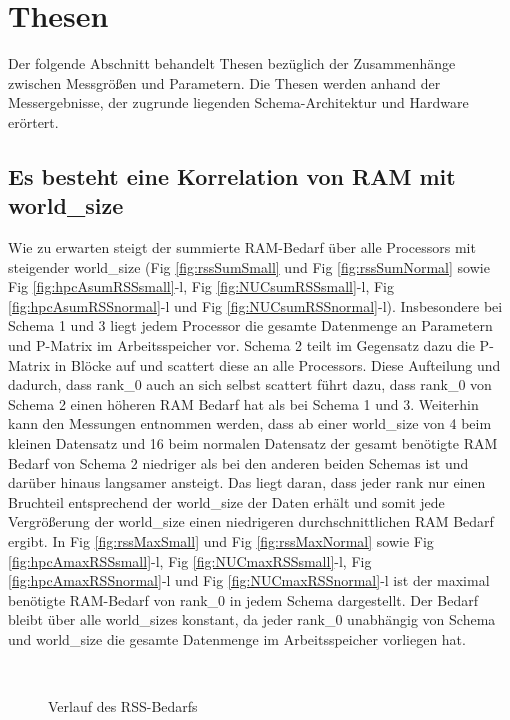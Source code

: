 \section{Thesen}
\label{sec:thesen}

Der folgende Abschnitt behandelt Thesen bezüglich der Zusammenhänge zwischen Messgrößen und Parametern.
Die Thesen werden anhand der Messergebnisse, der zugrunde liegenden Schema-Architektur und Hardware erörtert.

\subsection{Es besteht eine Korrelation von RAM mit world\_size}

Wie zu erwarten steigt der summierte RAM-Bedarf über alle Processors mit steigender world\_size
(Fig \ref{fig:rssSumSmall} und Fig \ref{fig:rssSumNormal} sowie Fig \ref{fig:hpcAsumRSSsmall}-l, Fig \ref{fig:NUCsumRSSsmall}-l, Fig \ref{fig:hpcAsumRSSnormal}-l und Fig \ref{fig:NUCsumRSSnormal}-l).
Insbesondere bei Schema 1 und 3 liegt jedem Processor
die gesamte Datenmenge an Parametern und P-Matrix im Arbeitsspeicher vor.
Schema 2 teilt im Gegensatz dazu die P-Matrix in Blöcke auf und scattert diese an alle Processors.
Diese Aufteilung und dadurch, dass rank\_0 auch an sich selbst
scattert führt dazu, dass rank\_0 von Schema 2 einen höheren RAM Bedarf hat als bei Schema 1 und 3.
Weiterhin kann den Messungen entnommen werden,
dass ab einer world\_size von 4 beim kleinen Datensatz und 16 beim normalen Datensatz
der gesamt benötigte RAM Bedarf von Schema 2 niedriger als bei den anderen beiden Schemas ist und darüber
hinaus langsamer ansteigt.
Das liegt daran, dass jeder rank nur einen Bruchteil entsprechend der world\_size der Daten erhält und somit jede Vergrößerung der
world\_size einen niedrigeren durchschnittlichen RAM Bedarf ergibt.
In Fig \ref{fig:rssMaxSmall} und Fig \ref{fig:rssMaxNormal} sowie Fig \ref{fig:hpcAmaxRSSsmall}-l, Fig \ref{fig:NUCmaxRSSsmall}-l, Fig \ref{fig:hpcAmaxRSSnormal}-l und Fig \ref{fig:NUCmaxRSSnormal}-l
ist der maximal benötigte RAM-Bedarf von rank\_0 in jedem Schema dargestellt.
Der Bedarf bleibt über alle world\_sizes konstant, da jeder rank\_0
unabhängig von Schema und world\_size die gesamte Datenmenge im Arbeitsspeicher vorliegen hat.

\begin{figure}[h]
	\\
	\caption{Verlauf des RSS-Bedarfs}
	\label{fig:NumberMeasurements}
\end{figure}

